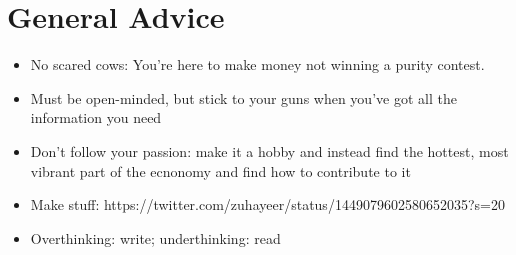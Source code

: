 \documentclass{../notes}
\begin{document}
\part{General Advice}
\begin{itemize}
    \item No scared cows: You're here to make money not winning a purity contest. 
    \item Must be open-minded, but stick to your guns when you've got all the information you need
    \item Don't follow your passion: make it a hobby and instead find the hottest, most vibrant part of the ecnonomy and find how to contribute to it
    \item Make stuff: https://twitter.com/zuhayeer/status/1449079602580652035?s=20
    \item Overthinking: write; underthinking: read
\end{itemize}
\end{document}
